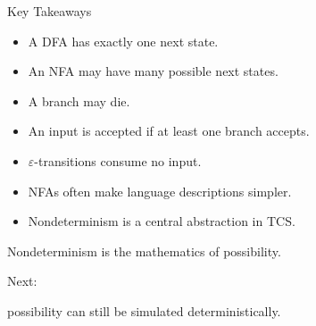 \documentclass[10pt,aspectratio=169]{beamer}
\newcommand{\eps}{\varepsilon}
\begin{document}
\begin{frame}{Key Takeaways}

\begin{itemize}
\item A DFA has exactly one next state.
\item An NFA may have many possible next states.
\item A branch may die.
\item An input is accepted if at least one branch accepts.
\item \(\eps\)-transitions consume no input.
\item NFAs often make language descriptions simpler.
\item Nondeterminism is a central abstraction in TCS.
\end{itemize}

\end{frame}

\begin{frame}[standout]
Nondeterminism is the mathematics of possibility.

Next:

possibility can still be simulated deterministically.
\end{frame}

\end{document}
